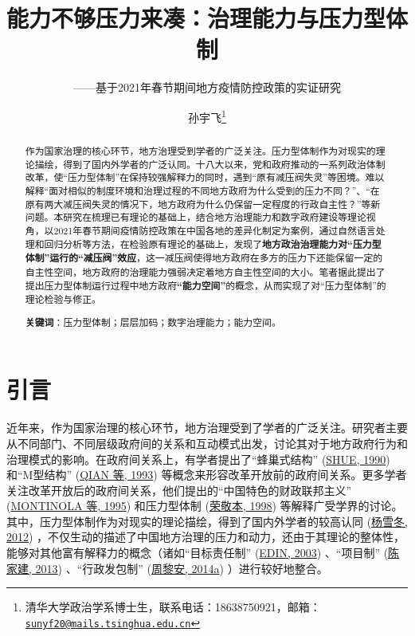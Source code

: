\documentclass[
  12pt,
]{ctexart}
\title{能力不够压力来凑：治理能力与压力型体制}
\subtitle{------基于2021年春节期间地方疫情防控政策的实证研究}
\author{孙宇飞\footnote{清华大学政治学系博士生，联系电话：18638750921，邮箱：\href{mailto:sunyf20@mails.tsinghua.edu.cn}{\nolinkurl{sunyf20@mails.tsinghua.edu.cn}}}}
\date{}
\begin{document}
\maketitle
\begin{abstract}
作为国家治理的核心环节，地方治理受到学者的广泛关注。压力型体制作为对现实的理论描绘，得到了国内外学者的广泛认同。十八大以来，党和政府推动的一系列政治体制改革，使``压力型体制''在保持较强解释力的同时，遇到``原有减压阀失灵''等困境。难以解释``面对相似的制度环境和治理过程的不同地方政府为什么受到的压力不同？''、``在原有两大减压阀失灵的情况下，地方政府为什么仍保留一定程度的行政自主性？''等新问题。本研究在梳理已有理论的基础上，结合地方治理能力和数字政府建设等理论视角，以2021年春节期间疫情防控政策在中国各地的差异化制定为案例，通过自然语言处理和回归分析等方法，在检验原有理论的基础上，发现了\textbf{地方政治治理能力对``压力型体制''运行的``减压阀''效应}，这一减压阀使得地方政府在多方的压力下还能保留一定的自主性空间，地方政府的治理能力强弱决定着地方自主性空间的大小。笔者据此提出了提出压力型体制运行过程中地方政府\textbf{``能力空间''}的概念，从而实现了对``压力型体制''的理论检验与修正。

\textbf{关键词}：压力型体制；层层加码；数字治理能力；能力空间。
\end{abstract}

\hypertarget{ux5f15ux8a00}{%
\section{引言}\label{ux5f15ux8a00}}

近年来，作为国家治理的核心环节，地方治理受到了学者的广泛关注。研究者主要从不同部门、不同层级政府间的关系和互动模式出发，讨论其对于地方政府行为和治理模式的影响。在政府间关系上，有学者提出了``蜂巢式结构'' (\protect\hyperlink{ref-Shue1990}{SHUE, 1990}) 和``M型结构'' (\protect\hyperlink{ref-QianXu1993}{QIAN 等, 1993}) 等概念来形容改革开放前的政府间关系。更多学者关注改革开放后的政府间关系，他们提出的``中国特色的财政联邦主义'' (\protect\hyperlink{ref-MontinolaEtAl1995}{MONTINOLA 等, 1995}) 和压力型体制 (\protect\hyperlink{ref-RongJingBen1998a}{荣敬本, 1998}) 等解释广受学界的讨论。其中，压力型体制作为对现实的理论描绘，得到了国内外学者的较高认同 (\protect\hyperlink{ref-YangXueDong2012}{杨雪冬, 2012}) ，不仅生动的描述了中国地方治理的压力和动力，还由于其理论的整体性，能够对其他富有解释力的概念（诸如``目标责任制'' (\protect\hyperlink{ref-Edin2003}{EDIN, 2003}) 、``项目制'' (\protect\hyperlink{ref-ChenJiaJian2013}{陈家建, 2013}) 、``行政发包制'' (\protect\hyperlink{ref-ZhouLiAn2014}{周黎安, 2014a}) ）进行较好地整合。
\end{document}

